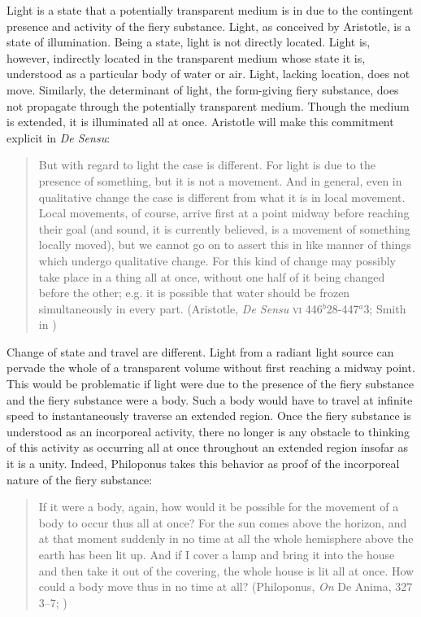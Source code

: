 Light is a state that a potentially transparent medium is in due to the contingent presence and activity of the fiery substance. Light, as conceived by Aristotle, is a state of illumination. Being a state, light is not directly located. Light is, however, indirectly located in the transparent medium whose state it is, understood as a particular body of water or air. Light, lacking location, does not move. Similarly, the determinant of light, the form-giving fiery substance, does not propagate through the potentially transparent medium. Though the medium is extended, it is illuminated all at once. Aristotle will make this commitment explicit in \emph{De Sensu}:
	\begin{quote}	
		But with regard to light the case is different. For light is due to the presence of something, but it is not a movement. And in general, even in qualitative change the case is different from what it is in local movement. Local movements, of course, arrive first at a point midway before reaching their goal (and sound, it is currently believed, is a movement of something locally moved), but we cannot go on to assert this in like manner of things which undergo qualitative change. For this kind of change may possibly take place in a thing all at once, without one half of it being changed before the other; e.g. it is possible that water should be frozen simultaneously in every part. (Aristotle, \emph{De Sensu} \textsc{vi} 446\( ^{b} \)28-447\( ^{a} \)3; Smith in \citealt[63]{Barnes:1984uq})
	\end{quote}
Change of state and travel are different. Light from a radiant light source can pervade the whole of a transparent volume without first reaching a midway point. This would be problematic if light were due to the presence of the fiery substance and the fiery substance were a body. Such a body would have to travel at infinite speed to instantaneously traverse an extended region. Once the fiery substance is understood as an incorporeal activity, there no longer is any obstacle to thinking of this activity as occurring all at once throughout an extended region insofar as it is a unity. Indeed, Philoponus takes this behavior as proof of the incorporeal nature of the fiery substance:
	\begin{quote}	
		If it were a body, again, how would it be possible for the movement of a body to occur thus all at once? For the sun comes above the horizon, and at that moment suddenly in no time at all the whole hemisphere above the earth has been lit up. And if I cover a lamp and bring it into the house and then take it out of the covering, the whole house is lit all at once. How could a body move thus in no time at all? (Philoponus, \emph{On} De Anima, 327 3--7; \citealt[11]{Charlton:2005fk})
	\end{quote}
